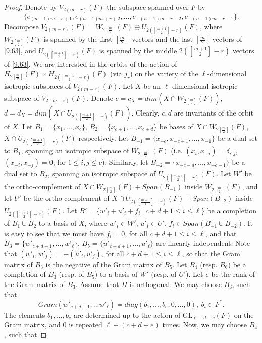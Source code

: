 \documentclass[12pts]{amsart}
\newcommand{\GL}{{\mathrm{GL}}}
\begin{document}
\begin{proof}
Denote by $V_{2(m-r)}(F)$ the subspace spanned over $F$ by 
\begin{equation}\label{9.63}
\{e_{(n-1)m+r+1},e_{(n-1)m+r+2},...,e_{-(n-1)m-r-2},e_{-(n-1)m-r-1}\}. 
\end{equation}
Decompose $V_{2(m-r)}(F)=W_{2[\frac{m}{2}]}(F)\oplus U_{2([\frac{m+1}{2}]-r)}(F)$, where $W_{2[\frac{m}{2}]}(F)$ is spanned by the first $[\frac{m}{2}]$ vectors and the last $[\frac{m}{2}]$ vectors of \eqref{9.63}, and $U_{2([\frac{m+1}{2}]-r)}(F)$ is spanned by the middle $2([\frac{m+1}{2}]-r)$ vectors of \eqref{9.63}. We are interested in the orbits of the action of $H_{2[\frac{m}{2}]}(F)\times H_{2([\frac{m+1}{2}]-r)}(F)$ (via $j_r$) on the variety of the $\ell$-dimensional isotropic subspaces of $V_{2(m-r)}(F)$. Let $X$ be an $\ell$-dimensional isotropic subspace of $V_{2(m-r)}(F)$. Denote $c=c_X=dim(X\cap W_{2[\frac{m}{2}]}(F))$, $d=d_X=dim(X\cap U_{2([\frac{m+1}{2}]-r)}(F))$. Clearly, $c,d$ are invariants of the orbit of $X$. Let $B_1=\{x_1,...,x_c\}$, $B_2=\{x_{c+1},...,x_{c+d}\}$ be bases of $X\cap W_{2[\frac{m}{2}]}(F)$, $X\cap U_{2([\frac{m+1}{2}]-r)}(F)$ respectively. Let $B_{-1}=\{x_{-c},x_{-c+1},...,x_{-1}\}$ be a dual set to $B_1$, spanning an isotropic subspace of $W_{2[\frac{m}{2}]}(F)$ (i.e. $(x_i,x_{-j})=\delta_{i,j}$, $(x_{-i},x_{-j})=0$, for $1\leq i,j\leq c$). Similarly, let $B_{-2}=\{x_{-c-d},...,x_{-c-1}\}$ be a dual set to $B_2$, spanning an isotropic subspace of $U_{2([\frac{m+1}{2}]-r)}(F)$. Let $W'$ be the ortho-complement of $X\cap W_{2[\frac{m}{2}]}(F)+Span(B_{-1})$ inside $W_{2[\frac{m}{2}]}(F)$, and let $U'$ be the ortho-complement of $X\cap U_{2([\frac{m+1}{2}]-r)}(F)+Span(B_{-2})$ inside $U_{2([\frac{m+1}{2}]-r)}(F)$. Let $B'=\{w'_i+u'_i+f_i\  |\ c+d+1\leq i\leq \ell \}$ be a completion of $B_1\cup B_2$ to a basis of $X$, where $w'_i\in W'$, $u'_i\in U'$, $f_i\in Span(B_{-1}\cup B_{-2})$. It is easy to see that we must have $f_i=0$, for all $c+d+1\leq i\leq \ell$, and that $B_3=\{w'_{c+d+1},...,w'_\ell\}$, $B_5=\{u'_{c+d+1},...,u'_\ell\}$ are linearly independent. Note that $(w'_i,w'_j)=-(u'_i,u'_j)$, for all $c+d+1\leq i\leq \ell$, so that the Gram matrix of $B_3$ is the negative of the Gram matrix of $B_5$. Let $B_4$ (resp. $B_6$) be a completion of $B_3$ (resp. of $B_5$) to a basis of $W'$ (resp. of $U'$). Let $e$ be the rank of the Gram matrix of $B_3$. Assume that $H$ is orthogonal. We may choose $B_3$, such that 
$$
Gram(w'_{c+d+1},...w'_\ell)=diag(b_1,...,b_e,0,...,0),\ b_i\in F^*.
$$
The elements $b_1,...,b_e$ are determined up to the action of $\GL_{\ell-d-c}(F)$ on the Gram matrix, and $0$ is repeated $\ell-(c+d+e)$ times. Now, we may choose $B_4$, such that

\end{proof}
\end{document}
